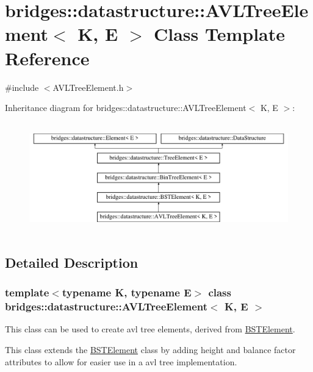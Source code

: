 \hypertarget{classbridges_1_1datastructure_1_1_a_v_l_tree_element}{}\section{bridges\+:\+:datastructure\+:\+:A\+V\+L\+Tree\+Element$<$ K, E $>$ Class Template Reference}
\label{classbridges_1_1datastructure_1_1_a_v_l_tree_element}


{\ttfamily \#include $<$A\+V\+L\+Tree\+Element.\+h$>$}

Inheritance diagram for bridges\+:\+:datastructure\+:\+:A\+V\+L\+Tree\+Element$<$ K, E $>$\+:\begin{figure}[H]
\begin{center}
\leavevmode
\includegraphics[height=4.794520cm]{classbridges_1_1datastructure_1_1_a_v_l_tree_element}
\end{center}
\end{figure}


\subsection{Detailed Description}
\subsubsection*{template$<$typename K, typename E$>$\newline
class bridges\+::datastructure\+::\+A\+V\+L\+Tree\+Element$<$ K, E $>$}

This class can be used to create avl tree elements, derived from \hyperlink{classbridges_1_1datastructure_1_1_b_s_t_element}{B\+S\+T\+Element}. 

This class extends the \hyperlink{classbridges_1_1datastructure_1_1_b_s_t_element}{B\+S\+T\+Element} class by adding height and balance factor attributes to allow for easier use in a avl tree implementation.

